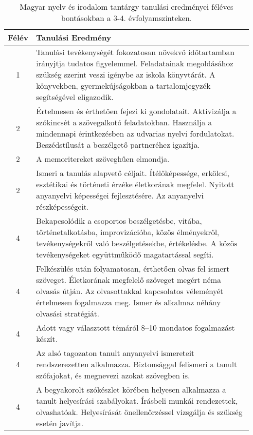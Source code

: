        
           \begin{longtable}{c | p{} }
            \caption[Magyar nyelv és irodalom 3-4.]{Magyar nyelv és irodalom tantárgy tanulási eredményei féléves bontásokban a 3-4. évfolyamszinteken. }  \\

            \textbf{Félév} & \textbf{Tanulási Eredmény} \\
            \hline
            \endhead
                                
                                          1 &  Tanulási tevékenységét fokozatosan növekvő időtartamban irányjtja tudatos figyelemmel. Feladatainak megoldásához szükség szerint veszi igénybe az iskola könyvtárát. A könyvekben, gyermekújságokban a tartalomjegyzék segítségével eligazodik. \\ \hline
                                      
                                
                                          2 &  Értelmesen és érthetően fejezi ki gondolatait. Aktivizálja a szókincsét a szövegalkotó feladatokban. Használja a mindennapi érintkezésben az udvarias nyelvi fordulatokat. Beszédstílusát a beszélgető partneréhez igazítja. \\ \hline
                                          2 &  A memoritereket szöveghűen elmondja. \\ \hline
                                          2 &  Ismeri a tanulás alapvető céljait. Ítélőképessége, erkölcsi, esztétikai és történeti érzéke életkorának megfelel. Nyitott anyanyelvi képességei fejlesztésére. Az anyanyelvi részképességeit. \\ \hline
                                      
                                
                                          4 &  Bekapcsolódik a csoportos beszélgetésbe, vitába, történetalkotásba, improvizációba, közös élményekről, tevékenységekről való beszélgetésekbe, értékelésbe. A közös tevékenységeket együttműködő magatartással segíti. \\ \hline
                                          4 &  Felkészülés után folyamatosan, érthetően olvas fel ismert szöveget. Életkorának megfelelő szöveget megért néma olvasás útján. Az olvasottakkal kapcsolatos véleményét értelmesen fogalmazza meg. Ismer és alkalmaz néhány olvasási stratégiát. \\ \hline
                                          4 &  Adott vagy választott témáról 8–10 mondatos fogalmazást készít. \\ \hline
                                          4 &  Az alsó tagozaton tanult anyanyelvi ismereteit rendszerezetten alkalmazza. Biztonsággal felismeri a tanult szófajokat, és megnevezi azokat szövegben is. \\ \hline
                                          4 &  A begyakorolt szókészlet körében helyesen alkalmazza a tanult helyesírási szabályokat. Írásbeli munkái rendezettek, olvashatóak. Helyesírását önellenőrzéssel vizsgálja és szükség esetén javítja. \\ \hline
                                      
                        \end{longtable}
